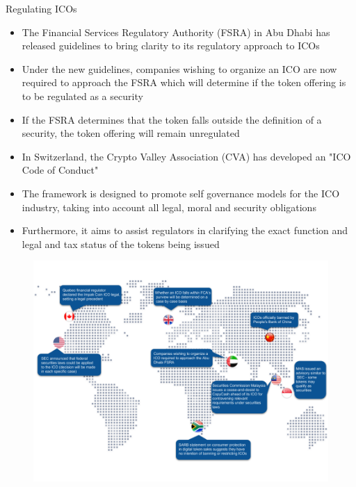 \documentclass[10pt]{beamer}
\begin{document}

\begin{frame}{Regulating ICOs}
	\begin{itemize}
		\item The Financial Services Regulatory Authority (FSRA) in Abu Dhabi has released guidelines to bring clarity to its regulatory approach to ICOs
		\item Under the new guidelines, companies wishing to organize an ICO are now required to approach the FSRA which will determine if the token offering is to be regulated as a security
		\item If the FSRA determines that the token falls outside the definition of a security, the token offering will remain unregulated
		\item In Switzerland, the Crypto Valley Association (CVA) has developed an "ICO Code of Conduct"
		\item The framework is designed to promote self governance models for the ICO industry, taking into account all legal, moral and security obligations
		\item Furthermore, it aims to assist regulators in clarifying the exact function and legal and tax status of the tokens being issued
	\end{itemize}
\end{frame}



\begin{frame}
	\begin{figure}[]
		\centering
		\includegraphics  [scale=0.3]{Images/ico-map}
	\end{figure}
\end{frame}
\end{document}
